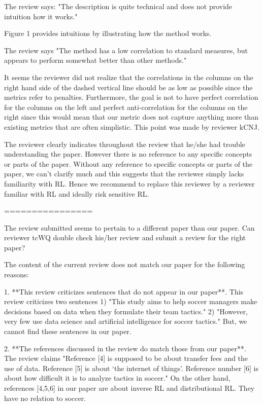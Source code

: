 \documentclass{article}
\begin{document}
The review says: "The description is quite technical and does not provide intuition how it works."

Figure 1 provides intuitions by illustrating how the method works. 

The review says "The method has a low correlation to standard measures, but appears to perform somewhat better than other methods."

It seems the reviewer did not realize that the correlations in the columns on the right hand side of the dashed vertical line should be as low as possible since the metrics refer to penalties.  Furthermore, the goal is not to have perfect correlation for the columns on the left and perfect anti-correlation for the columns on the right since this would mean that our metric does not capture anything more than existing metrics that are often simplistic.  This point was made by reviewer kCNJ. 

The reviewer clearly indicates throughout the review that he/she had trouble understanding the paper.  However there is no reference to any specific concepts or parts of the paper.  Without any reference to specific concepts or parts of the paper, we can't clarify much and this suggests that the reviewer simply lacks familiarity with RL. Hence we recommend to replace this reviewer by a reviewer familiar with RL and ideally risk sensitive RL.


================

The review submitted seems to pertain to a different paper than our paper.  Can reviewer tcWQ double check his/her review and submit a review for the right paper?

The content of the current review does not match our paper for the following reasons:

1. **This review criticizes sentences that do not appear in our paper**. This review criticizes two sentences 1) "This study aims to help soccer managers make decisions based on data when they formulate their team tactics." 2) "However, very few use data science and artificial intelligence for soccer tactics."  But, we cannot find these sentences in our paper.

2. **The references discussed in the review do match those from our paper**. The review claims "Reference [4] is supposed to be about transfer fees and the use of data. Reference [5] is about ‘the internet of things’. Reference number [6] is about how difficult it is to analyze tactics in soccer." On the other hand, references [4,5,6] in our paper are about inverse RL and distributional RL. They have no relation to soccer.
\end{document}
